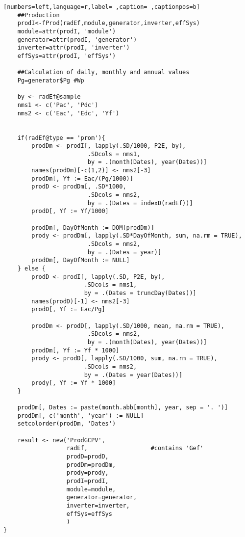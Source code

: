 \begin{lstlisting}[numbers=left,language=r,label= ,caption= ,captionpos=b]
    ##Production
    prodI<-fProd(radEf,module,generator,inverter,effSys)
    module=attr(prodI, 'module')
    generator=attr(prodI, 'generator')
    inverter=attr(prodI, 'inverter')
    effSys=attr(prodI, 'effSys')

    ##Calculation of daily, monthly and annual values
    Pg=generator$Pg #Wp

    by <- radEf@sample
    nms1 <- c('Pac', 'Pdc')
    nms2 <- c('Eac', 'Edc', 'Yf')


    if(radEf@type == 'prom'){
        prodDm <- prodI[, lapply(.SD/1000, P2E, by),
                        .SDcols = nms1,
                        by = .(month(Dates), year(Dates))]
        names(prodDm)[-c(1,2)] <- nms2[-3]
        prodDm[, Yf := Eac/(Pg/1000)]
        prodD <- prodDm[, .SD*1000,
                        .SDcols = nms2,
                        by = .(Dates = indexD(radEf))]
        prodD[, Yf := Yf/1000]

        prodDm[, DayOfMonth := DOM(prodDm)]
        prody <- prodDm[, lapply(.SD*DayOfMonth, sum, na.rm = TRUE),
                        .SDcols = nms2,
                        by = .(Dates = year)]
        prodDm[, DayOfMonth := NULL]
    } else {
        prodD <- prodI[, lapply(.SD, P2E, by),
                       .SDcols = nms1,
                       by = .(Dates = truncDay(Dates))]
        names(prodD)[-1] <- nms2[-3]
        prodD[, Yf := Eac/Pg]

        prodDm <- prodD[, lapply(.SD/1000, mean, na.rm = TRUE),
                        .SDcols = nms2,
                        by = .(month(Dates), year(Dates))]
        prodDm[, Yf := Yf * 1000]
        prody <- prodD[, lapply(.SD/1000, sum, na.rm = TRUE),
                       .SDcols = nms2,
                       by = .(Dates = year(Dates))]
        prody[, Yf := Yf * 1000]
    }

    prodDm[, Dates := paste(month.abb[month], year, sep = '. ')]
    prodDm[, c('month', 'year') := NULL]
    setcolorder(prodDm, 'Dates')

    result <- new('ProdGCPV',
                  radEf,                  #contains 'Gef'
                  prodD=prodD,
                  prodDm=prodDm,
                  prody=prody,
                  prodI=prodI,
                  module=module,
                  generator=generator,
                  inverter=inverter,
                  effSys=effSys
                  )
}
\end{lstlisting}

